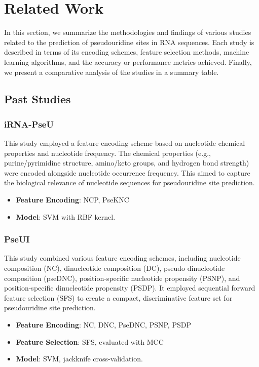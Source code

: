 \chapter{Related Work}\label{ch:related-work}
  In this section, we summarize the methodologies and findings of various studies related to the prediction of pseudouridine sites in RNA sequences.
  Each study is described in terms of its encoding schemes, feature selection methods, machine learning algorithms, and the accuracy or performance metrics achieved.
  Finally, we present a comparative analysis of the studies in a summary table.


  \section{Past Studies}\label{sec:past-studies}

    \subsection*{iRNA-PseU \cite{chen_irna-pseu_nodate}}\label{subsec:iRNA-PseU}
      This study employed a feature encoding scheme based on nucleotide chemical properties and nucleotide frequency.
      The chemical properties (e.g., purine/pyrimidine structure, amino/keto groups, and hydrogen bond strength) were encoded alongside nucleotide occurrence frequency.
      This aimed to capture the biological relevance of nucleotide sequences for pseudouridine site prediction.

      \begin{itemize}
        \item \textbf{Feature Encoding}: NCP, PseKNC
        \item \textbf{Model}: SVM with RBF kernel.
      \end{itemize}

    \subsection*{PseUI \cite{he_pseui_2018}}\label{subsec:PseUI}
      This study combined various feature encoding schemes, including nucleotide composition (NC), dinucleotide composition (DC), pseudo dinucleotide composition (pseDNC), position-specific nucleotide propensity (PSNP), and position-specific dinucleotide propensity (PSDP). It employed sequential forward feature selection (SFS) to create a compact, discriminative feature set for pseudouridine site prediction.

      \begin{itemize}
        \item \textbf{Feature Encoding}: NC, DNC, PseDNC, PSNP, PSDP
        \item \textbf{Feature Selection}: SFS, evaluated with MCC
        \item \textbf{Model}: SVM, jackknife cross-validation.
      \end{itemize}


